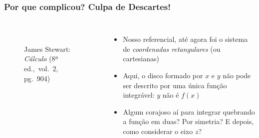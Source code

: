 \documentclass[pdftex, brazil, aspectratio=169]{beamer}
\begin{document}
\begin{frame}[t]
  \frametitle{Por que complicou? Culpa de Descartes!}
  \begin{columns}
    \centering
    \begin{figure}[H]
      \begin{center}
        \label{fig:int2-05}
        \\
        \footnotesize{James Stewart: \emph{Cálculo} (8ª ed.,\ vol.\ 2, pg.\ 904)}
      \end{center}
    \end{figure}
      \begin{itemize}
        \item Nosso referencial, até agora foi o sistema de \emph{coordenadas
              retangulares} (ou cartesianas)
        \item Aqui, o disco formado por $x$ e $y$ não pode ser descrito por
              uma única função integrável: $y$ não é $f(x)$
        \item Algum corajoso aí para integrar quebrando a função em duas?
              Por simetria? E depois, como considerar o eixo $z$?
      \end{itemize}
  \end{columns}
\end{frame}
\end{document}
